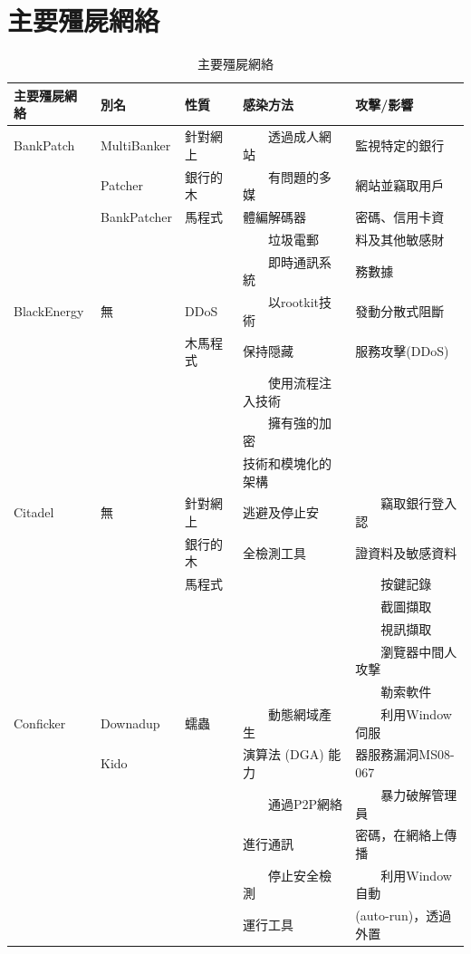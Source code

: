 \documentclass[14pt]{extarticle}
\newcommand{\tabitem}{~~\llap{\textbullet}~~}
\begin{document}
\section{主要殭屍網絡}
\begin{table}[!htbp]
\centering
\caption{主要殭屍網絡}
\begin{tabular}{lllll} \hline
\bf 主要殭屍網絡 & \bf 別名 & \bf 性質 & \bf 感染方法 & \bf 攻擊/影響\\\hline
BankPatch & MultiBanker     &針對網上  &\tabitem 透過成人網站 &監視特定的銀行 \\
          & Patcher         &銀行的木  &\tabitem 有問題的多媒 &網站並竊取用戶 \\
          & BankPatcher     &馬程式   & 體編解碼器            & 密碼、信用卡資 \\
          &                         &        & \tabitem 垃圾電郵    & 料及其他敏感財\\
 &&&\tabitem 即時通訊系統&務數據 \\\hline
BlackEnergy & 無 & DDoS & \tabitem 以rootkit技術 & 發動分散式阻斷 \\
&&木馬程式&保持隠藏&服務攻擊(DDoS)\\
&&&\tabitem 使用流程注入技術 & \\
&&&\tabitem 擁有強的加密 & \\
&&& 技術和模塊化的架構 \\\hline
Citadel  & 無     &針對網上  &逃避及停止安 &\tabitem 竊取銀行登入認 \\
          &       &銀行的木  &全檢測工具 &證資料及敏感資料 \\
          &      &馬程式    &          & \tabitem 按鍵記錄 \\
 & & & & \tabitem 截圖擷取 \\
 & & & & \tabitem 視訊擷取 \\
 & & & & \tabitem 瀏覽器中間人攻撃 \\
 & & & & \tabitem 勒索軟件 \\\hline
Conficker & Downadup & 蠕蟲 & \tabitem 動態網域產生& \tabitem 利用Window伺服 \\
 & Kido & & 演算法 (DGA) 能力 & 器服務漏洞MS08-067\\
 & & & \tabitem 通過P2P網絡 & \tabitem 暴力破解管理員 \\
 & & & 進行通訊 & 密碼，在網絡上傳播 \\
 & & & \tabitem 停止安全檢測 & \tabitem 利用Window自動 \\
 & & & 運行工具 & (auto-run)，透過外置 \\

\end{tabular}
\end{table}
\end{document}
